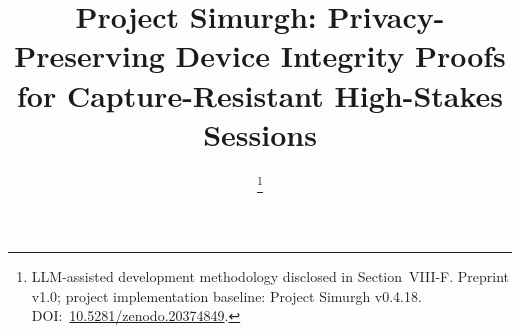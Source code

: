 \documentclass[conference]{IEEEtran}
\begin{document}
\title{Project Simurgh: Privacy-Preserving Device Integrity Proofs for Capture-Resistant High-Stakes Sessions}

\author{
\thanks{LLM-assisted development methodology disclosed in Section~VIII-F. Preprint v1.0; project implementation baseline: Project Simurgh v0.4.18. DOI:~\href{https://doi.org/10.5281/zenodo.20374849}{10.5281/zenodo.20374849}.}}

\maketitle
\end{document}
